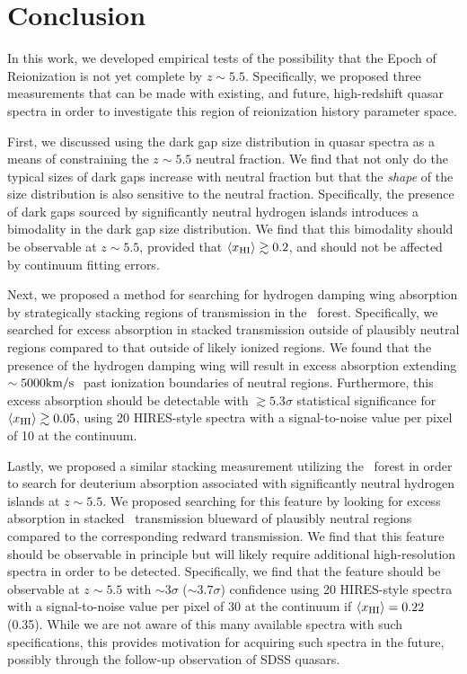 \section{Conclusion} \label{sec:Conclusion}


In this work, we developed empirical tests of the possibility that the Epoch of Reionization is not yet complete by $z \sim 5.5$. Specifically, we proposed three measurements that can be made with existing, and future, high-redshift quasar spectra in order to investigate this region of reionization history parameter space. 


First, we discussed using the dark gap size distribution in quasar spectra as a means of constraining the $z \sim 5.5$ neutral fraction. We find that not only do the typical sizes of dark gaps increase with neutral fraction but that the \textit{shape} of the size distribution is also sensitive to the neutral fraction. Specifically, the presence of dark gaps sourced by significantly neutral hydrogen islands introduces a bimodality in the dark gap size distribution. We find that this bimodality should be observable at $z \sim 5.5$, provided that $\langle x_{\text{HI}}\rangle \gtrsim 0.2$, and should not be affected by continuum fitting errors. 


Next, we proposed a method for searching for hydrogen damping wing absorption by strategically stacking regions of transmission in the \lya\ forest. Specifically, we searched for excess absorption in stacked transmission outside of plausibly neutral regions compared to that outside of likely ionized regions. We found that the presence of the hydrogen damping wing will result in excess absorption extending $\sim 5000\text{km}/\text{s}\ $ past ionization boundaries of neutral regions. Furthermore, this excess absorption should be detectable with $\gtrsim 5.3\sigma$ statistical significance for $\langle x_{\text{HI}}\rangle \gtrsim 0.05$, using 20 HIRES-style spectra with a signal-to-noise value per pixel of 10 at the continuum. 


Lastly, we proposed a similar stacking measurement utilizing the \lyb\ forest in order to search for deuterium absorption associated with significantly neutral hydrogen islands at $z \sim 5.5$. We proposed searching for this feature by looking for excess absorption in stacked \lyb\ transmission blueward of plausibly neutral regions compared to the corresponding redward transmission. We find that this feature should be observable in principle but will likely require additional high-resolution spectra in order to be detected. Specifically, we find that the feature should be observable at $z \sim 5.5$ with $\sim3\sigma$ ($\sim 3.7\sigma$) confidence using 20 HIRES-style spectra with a signal-to-noise value per pixel of 30 at the continuum if $\langle x_{\text{HI}}\rangle = 0.22$ (0.35). While we are not aware of this many available spectra with such specifications, this provides motivation for acquiring such spectra in the future, possibly through the follow-up observation of SDSS quasars. 


